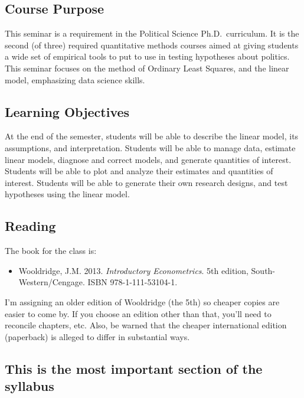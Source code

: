 \documentclass[
  letterpaper,
  DIV=11,
  numbers=noendperiod]{scrartcl}
\providecommand{\tightlist}{%
  \setlength{\itemsep}{0pt}\setlength{\parskip}{0pt}}\usepackage{longtable,booktabs,array}
\begin{document}
\hypertarget{course-purpose}{%
\subsection{Course Purpose}\label{course-purpose}}

This seminar is a requirement in the Political Science Ph.D.~curriculum.
It is the second (of three) required quantitative methods courses aimed
at giving students a wide set of empirical tools to put to use in
testing hypotheses about politics. This seminar focuses on the method of
Ordinary Least Squares, and the linear model, emphasizing data science
skills.

\hypertarget{learning-objectives}{%
\subsection{Learning Objectives}\label{learning-objectives}}

At the end of the semester, students will be able to describe the linear
model, its assumptions, and interpretation. Students will be able to
manage data, estimate linear models, diagnose and correct models, and
generate quantities of interest. Students will be able to plot and
analyze their estimates and quantities of interest. Students will be
able to generate their own research designs, and test hypotheses using
the linear model.

\hypertarget{reading}{%
\subsection{Reading}\label{reading}}

The book for the class is:

\begin{itemize}
\tightlist
\item
  Wooldridge, J.M. 2013. \emph{Introductory Econometrics}. 5th edition,
  South-Western/Cengage. ISBN 978-1-111-53104-1.
\end{itemize}

I'm assigning an older edition of Wooldridge (the 5th) so cheaper copies
are easier to come by. If you choose an edition other than that, you'll
need to reconcile chapters, etc. Also, be warned that the cheaper
international edition (paperback) is alleged to differ in substantial
ways.

\hypertarget{this-is-the-most-important-section-of-the-syllabus}{%
\subsection{This is the most important section of the
syllabus}\label{this-is-the-most-important-section-of-the-syllabus}}
\end{document}
